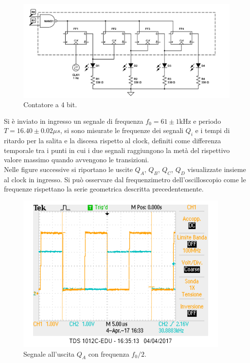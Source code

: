 \documentclass[10pt,a4paper]{article}
\begin{document}
\begin{figure}
\centering
\includegraphics[scale=0.5]{divisore.png}
\caption{Contatore a 4 bit.\label{contatore}}
\end{figure}

Si è inviato in ingresso un segnale di frequenza $f_0 = 61 \pm 1$kHz e periodo $T = 16.40 \pm 0.02 \mu s$, si sono misurate le frequenze dei segnali $Q_i$ e i tempi di ritardo per la salita e la discesa rispetto al clock, definiti come differenza temporale tra i punti in cui i due segnali raggiungono la metà del rispettivo valore massimo quando avvengono le transizioni.\\

Nelle figure successive si riportano le uscite $Q_A$, $Q_B$, $Q_C$, $Q_D$ visualizzate insieme al clock in ingresso. Si può osservare dal frequenzimetro dell'oscilloscopio come le frequenze rispettano la serie geometrica descritta precedentemente.\\

\begin{figure}
\centering
\includegraphics[scale=1.0]{QA1-2.png}
\caption{Segnale all'uscita $Q_A$ con frequenza $f_0/2$.\label{freq2}}
\end{figure}
\end{document}
